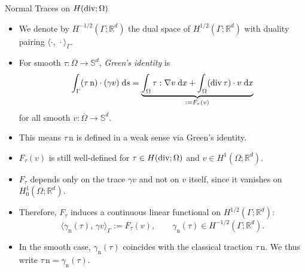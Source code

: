 \documentclass[10pt,aspectratio=169]{beamer}
\def\R{{\mathbb R}}
\def\S{{\mathbb S}}
\def\d{{\mathrm{d}}}
\def\dx{{\d x}}
\def\ds{{\d s}}
\newcommand{\diver}{\operatornamewithlimits{div}}
\begin{document}
\begin{frame}{Normal Traces on $H(\diver;\Omega)$}
	\begin{itemize}
		\item We denote by $H^{-1/2}(\Gamma;\R^d)$ the dual space of $H^{1/2}(\Gamma;\R^d)$ with duality pairing $\langle\cdot,\,\cdot\rangle_\Gamma$.
		\item For smooth $\tau:\overline{\Omega}\to\S^d$, {\em Green's identity} is
		      \begin{equation*}
			      \int_\Gamma (\tau\,\mathrm n)\cdot (\gamma v)\;\ds = \underbrace{\int_\Omega \tau:\nabla v\;\dx+\int_\Omega (\diver\tau)\cdot v\;\dx}_{:= F_\tau(v)}
		      \end{equation*}
		      for all smooth $v:\overline{\Omega}\to\S^d$.
		\item This means $\tau\,\mathrm{n}$ is defined in a weak sense via Green's identity.
		\item $F_\tau(v)$ is still well-defined for $\tau\in H(\diver;\Omega)$ and $v\in H^1(\Omega;\R^d)$.
		\item $F_\tau$ depends only on the trace $\gamma v$ and not on $v$ itself, since it vanishes on $H_0^1(\Omega;\R^d)$.
		\item Therefore, $F_\tau$ induces a continuous linear functional on $H^{1/2}(\Gamma;\R^d)$:
		      \begin{equation*}
			      \langle \gamma_{\mathrm n}(\tau),\,\gamma v\rangle_\Gamma := F_\tau(v),
			      \qquad \gamma_{\mathrm n}(\tau)\in H^{-1/2}(\Gamma;\R^d).
		      \end{equation*}
		\item In the smooth case, $\gamma_{\mathrm n}(\tau)$ coincides with the classical traction $\tau\,\mathrm n$. We thus write $\tau\,\mathrm{n} = \gamma_{\mathrm n}(\tau)$.
	\end{itemize}
\end{frame}
\end{document}
